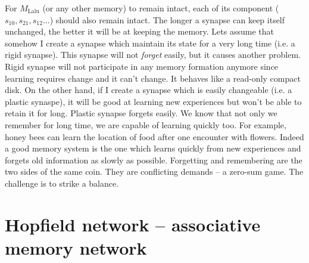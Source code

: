 \documentclass[]{resonance}
\begin{document}
For $M_\text{Lalu}$ (or any other memory) to remain intact, each of its
component ($s_{10}, s_{21}, s_{12} \ldots$) should also remain intact.  The
longer a synapse can keep itself unchanged, the better it will be at keeping the
memory. Lets assume that somehow I create a synapse which maintain its state for
a very long time (i.e. a rigid synapse). This synapse will not \emph{forget}
easily, but it causes another problem. Rigid synapse will not participate in any
memory formation anymore since learning requires change and it can't change. It
behaves like a read-only compact disk. On the other hand, if I create a synapse
which is easily changeable (i.e. a plastic synaspe), it will be good at learning
new experiences but won't be able to retain it for long. Plastic synapse forgets
easily.  We know that not only we remember for long time, we are capable of
learning quickly too. For example, honey bees can learn the location of food
after one encounter with flowers.  Indeed a good memory system is the one which
learns quickly from new experiences and forgets old information as slowly as
possible.  Forgetting and remembering are the two sides of the same coin.  They
are conflicting demands -- a zero-sum game.  The challenge is to strike a
balance. 

\section{Hopfield network -- associative memory network}\label{sec:hopfield}


\end{document}
